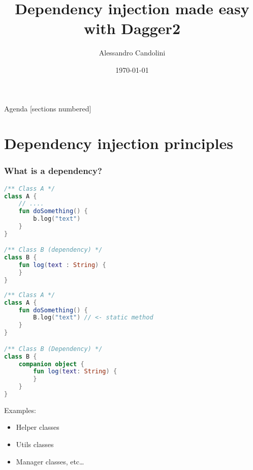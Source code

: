 \documentclass[10pt]{beamer}
\title{Dependency injection made easy with Dagger2}
\date{\today}
\author[A. Candolini]{Alessandro Candolini}
\begin{document}
\maketitle

\begin{frame}{Agenda}
  [sections numbered]
  \tableofcontents[hideallsubsections]
\end{frame}

\section{Dependency injection principles}
\begin{frame}[fragile]
	\frametitle{What is a dependency?}
		\begin{figure}
			\centering
{}
		\end{figure}
\end{frame}
\begin{frame}[fragile]
\begin{lstlisting}[language=Kotlin, basicstyle=\ttfamily]
/** Class A */
class A {
    // ....
    fun doSomething() {
        b.log("text")
    }
}

/** Class B (dependency) */
class B {
    fun log(text : String) {
    }
}
\end{lstlisting} 
\end{frame}
	\begin{frame}[fragile]
\begin{lstlisting}[language=Kotlin, basicstyle=\ttfamily]
/** Class A */
class A {
    fun doSomething() {
        B.log("text") // <- static method
    }
}

/** Class B (Dependency) */
class B {
    companion object {
        fun log(text: String) {
        }
    }
}
\end{lstlisting} 
	\end{frame}

	\begin{frame}
		Examples:
		\begin{itemize}
			\item Helper  classes
			\item Utils  classes
			\item Manager classes, etc\ldots
		\end{itemize}
	\end{frame}
\end{document}
